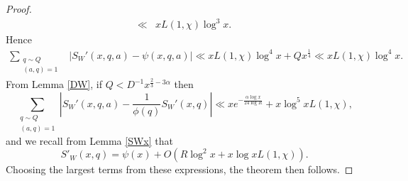 \documentclass[10pt,a4paper]{amsart}
\begin{document}
\begin{proof}
\begin{align*}
\ll &xL(1,\chi)\log^{3} x.
\end{align*}
Hence
\begin{align*}
\sum_{\substack{q\sim Q  \\ (a,q)=1}}&\left|S_W'(x,q,a)-\psi(x,q,a)\right|\ll xL(1,\chi)\log^4 x+Qx^\frac 14\ll xL(1,\chi)\log^4 x.
\end{align*}
From Lemma \ref{DW}, if $Q<D^{-1}x^{\frac 23-3\alpha}$ then
$$\sum_{\substack{q\sim Q  \\ (a,q)=1}}\left|S_W'(x,q,a)-\frac{1}{\phi(q)}S_W'(x,q)\right|\ll xe^{-\frac{\alpha\log x}{24\log R}}+x\log^5 xL(1,\chi),$$
and we recall from Lemma \ref{SWx} that
$$S'_W(x,q)=\psi(x)+O\left(R\log^2 x+x\log xL(1,\chi)\right).$$
Choosing the largest terms from these expressions, the theorem then follows.
\end{proof}
\end{document}
